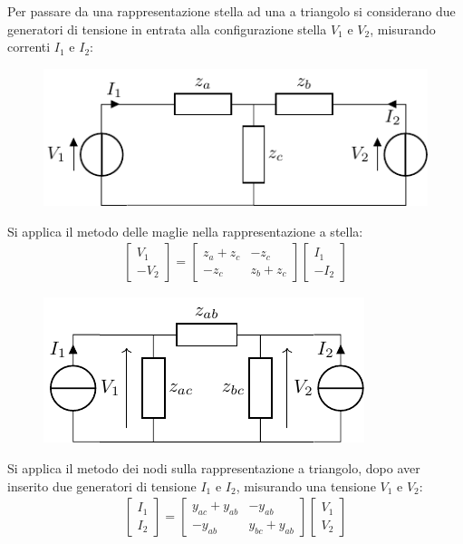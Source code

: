 \documentclass{article}
\numberwithin{equation}{subsection}
\begin{document}
Per passare da una rappresentazione stella ad una a triangolo si considerano due generatori di tensione in entrata alla configurazione stella $V_1$ e $V_2$, misurando 
correnti $I_1$ e $I_2$:
\begin{figure}[H]%
    \centering
    \includegraphics{rappresentazione-stella-entrate.pdf}%
    \label{fig:rappresentazione-stella-entrate}
\end{figure}
Si applica il metodo delle maglie nella rappresentazione a stella:
\begin{gather*}
    \begin{bmatrix}
        V_1\\-V_2
    \end{bmatrix}=\begin{bmatrix}
        z_a+z_c&-z_c\\-z_c&z_b+z_c
    \end{bmatrix}\begin{bmatrix}
        I_1\\-I_2
    \end{bmatrix}
\end{gather*}
\begin{figure}[H]%
    \centering
    \includegraphics{rappresentazione-triangolo-entrate.pdf}%
    \label{fig:rappresentazione-triangolo-entrate}
\end{figure}
Si applica il metodo dei nodi sulla rappresentazione a triangolo, dopo aver inserito due generatori di tensione $I_1$ e $I_2$, misurando una 
tensione $V_1$ e $V_2$:
\begin{gather*}
    \begin{bmatrix}
        I_1\\I_2
    \end{bmatrix}=\begin{bmatrix}
        y_{ac}+y_{ab}&-y_{ab}\\-y_{ab}&y_{bc}+y_{ab}
    \end{bmatrix}\begin{bmatrix}
        V_1\\V_2
    \end{bmatrix}
\end{gather*}
\end{document}
